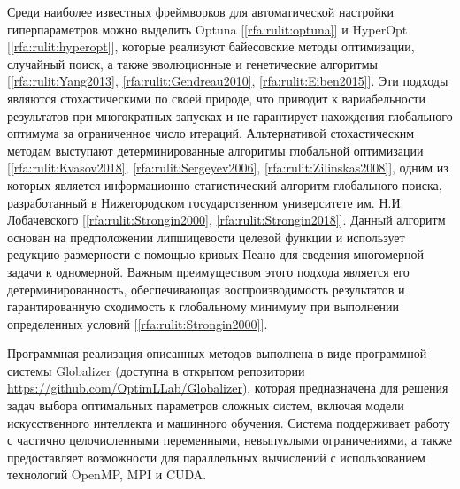 \documentclass[10pt,a4paper]{book}
\begin{document}
Среди наиболее известных фреймворков для автоматической настройки гиперпараметров можно выделить Optuna [\ref{rfa:rulit:optuna}] и HyperOpt [\ref{rfa:rulit:hyperopt}], которые реализуют байесовские методы оптимизации, случайный поиск, а также эволюционные и генетические алгоритмы [\ref{rfa:rulit:Yang2013}, \ref{rfa:rulit:Gendreau2010}, \ref{rfa:rulit:Eiben2015}]. Эти подходы являются стохастическими по своей природе, что приводит к вариабельности результатов при многократных запусках и не гарантирует нахождения глобального оптимума за ограниченное число итераций. Альтернативой стохастическим методам выступают детерминированные алгоритмы глобальной оптимизации [\ref{rfa:rulit:Kvasov2018}, \ref{rfa:rulit:Sergeyev2006}, \ref{rfa:rulit:Zilinskas2008}], одним из которых является информационно-статистический алгоритм глобального поиска, разработанный в Нижегородском государственном университете им. Н.И. Лобачевского [\ref{rfa:rulit:Strongin2000}, \ref{rfa:rulit:Strongin2018}]. Данный алгоритм основан на предположении липшицевости целевой функции и использует редукцию размерности с помощью кривых Пеано для сведения многомерной задачи к одномерной. Важным преимуществом этого подхода является его детерминированность, обеспечивающая воспроизводимость результатов и гарантированную сходимость к глобальному минимуму при выполнении определенных условий [\ref{rfa:rulit:Strongin2000}].

Программная реализация описанных методов выполнена в виде программной системы Globalizer (доступна в открытом репозитории \url{https://github.com/OptimLLab/Globalizer}), которая предназначена для решения задач выбора оптимальных параметров сложных систем, включая модели искусственного интеллекта и машинного обучения. Система поддерживает работу с частично целочисленными переменными, невыпуклыми ограничениями, а также предоставляет возможности для параллельных вычислений с использованием технологий OpenMP, MPI и CUDA.
\end{document}
